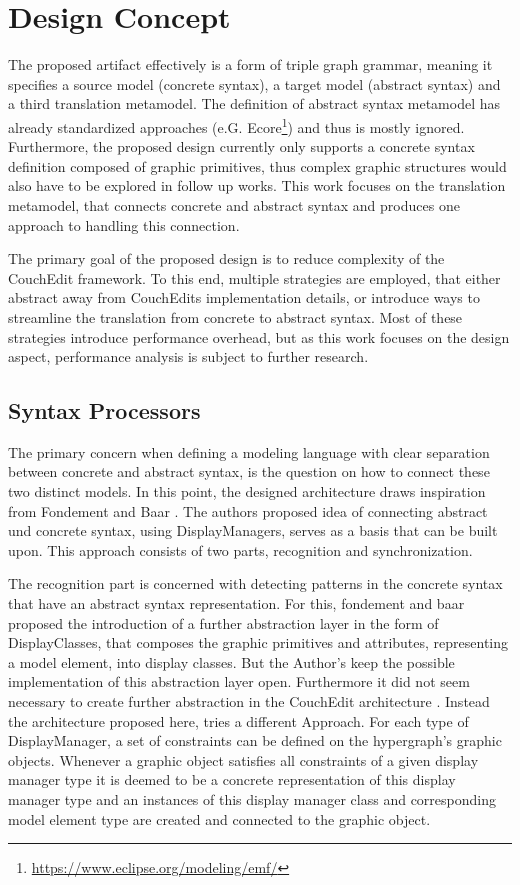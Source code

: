 \chapter{Design Concept}
\label{chap:design}
The proposed artifact effectively is a form of triple graph grammar, meaning it specifies a source model (concrete syntax), a target model (abstract syntax) and a third translation metamodel. The definition of abstract syntax metamodel has already standardized approaches (e.G. Ecore\footnote{\url{https://www.eclipse.org/modeling/emf/}}) and thus is mostly ignored. Furthermore, the proposed design currently only supports a concrete syntax definition composed of graphic primitives, thus complex graphic structures would also have to be explored in follow up works. This work focuses on the translation metamodel, that connects concrete and abstract syntax and produces one approach to handling this connection.

The primary goal of the proposed design is to reduce complexity of the CouchEdit framework. To this end, multiple strategies are employed, that either abstract away from CouchEdits implementation details, or introduce ways to streamline the translation from concrete to abstract syntax. Most of these strategies introduce performance overhead, but as this work focuses on the design aspect, performance analysis is subject to further research. 



\section{Syntax Processors}
The primary concern when defining a modeling language with clear separation between concrete and abstract syntax, is the question on how to connect these two distinct models. In this point, the designed architecture draws inspiration from Fondement and Baar \cite{fondement_making_2005}. The authors proposed idea of connecting abstract und concrete syntax, using DisplayManagers, serves as a basis that can be built upon. This approach consists of two parts, recognition and synchronization. 

The recognition part is concerned with detecting patterns in the concrete syntax that have an abstract syntax representation. For this, fondement and baar proposed the introduction of a further abstraction layer in the form of DisplayClasses, that composes the graphic primitives and attributes, representing a model element, into display classes. But the Author's keep the possible implementation of this abstraction layer open. Furthermore it did not seem necessary to create further abstraction in the CouchEdit architecture . Instead the architecture proposed here, tries a different Approach. For each type of DisplayManager, a set of constraints can be defined on the hypergraph's graphic objects. Whenever a graphic object satisfies all constraints of a given display manager type it is deemed to be a concrete representation of this display manager type and an instances of this display manager class and corresponding model element type are created and connected to the graphic object. 


